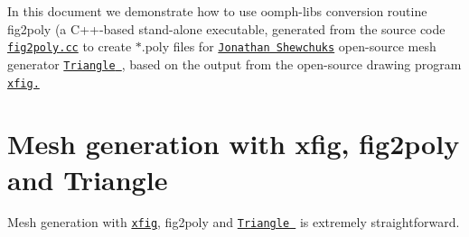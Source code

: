 In this document we demonstrate how to use {\ttfamily oomph-\/lib\textquotesingle{}s} conversion routine {\ttfamily fig2poly} (a C++-\/based stand-\/alone executable, generated from the source code \href{../../../../demo_drivers/meshing/mesh_from_xfig_triangle/fig2poly.cc}{\tt fig2poly.\+cc} to create {\ttfamily $\ast$}.{\ttfamily poly} files for \href{http://www.cs.berkeley.edu/~jrs/}{\tt Jonathan Shewchuk\textquotesingle{}s} open-\/source mesh generator \href{http://www.cs.cmu.edu/~quake/triangle.html}{\tt {\ttfamily Triangle} }, based on the output from the open-\/source drawing program \href{http://en.wikipedia.org/wiki/Xfig}{\tt xfig.}



 

\hypertarget{index_xfig_input}{}\section{Mesh generation with xfig, fig2poly and Triangle}\label{index_xfig_input}
Mesh generation with \href{http://en.wikipedia.org/wiki/Xfig}{\tt xfig}, {\ttfamily fig2poly} and \href{http://www.cs.cmu.edu/~quake/triangle.html}{\tt {\ttfamily Triangle} } is extremely straightforward.


